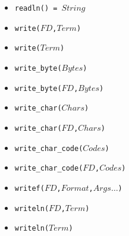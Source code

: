 \documentclass[10pt]{article}
\newcommand{\ignore}[1]{}
\begin{document}
\begin{multicols}{2}
\begin{scriptsize}
\begin{itemize}
   \item \texttt{readln() = $String$}
   \item \texttt{write($FD$,$Term$)}
   \item \texttt{write($Term$)}
   \item \texttt{write\_byte($Bytes$)}
   \item \texttt{write\_byte($FD$,$Bytes$)}
   \item \texttt{write\_char($Chars$)}
   \item \texttt{write\_char($FD$,$Chars$)}
   \item \texttt{write\_char\_code($Codes$)}
   \item \texttt{write\_char\_code($FD$,$Codes$)}
   \item \texttt{writef($FD$,$Format$,$Args\ldots$)}
   \item \texttt{writeln($FD$,$Term$)}
   \item \texttt{writeln($Term$)}
\ignore{
   \item \texttt{peek\_int($FD$) = $Int$}
   \item \texttt{peek\_real($FD$) = $Real$}
   \item \texttt{getpos($FD$) = $Pos$}
   \item \texttt{mkfifo($Path$)}
   \item \texttt{mkfifo($Path$,$Mode$)}
   \item \texttt{mkpipe() = $FD\_Map$}
   \item \texttt{mktmp() = $FD$}
   \item \texttt{peek\_unicode\_char($FD$) = $Val$}
   \item \texttt{rewind($FD$)}
   \item \texttt{seek($FD$,$Offset$,$From$)}
   \item \texttt{setpos($FD$,$Pos$)}
   \item \texttt{sizeof\_char() = $Size$}
   \item \texttt{stderr}
   \item \texttt{stdin}
   \item \texttt{stdout}
}
\end{itemize}
\end{scriptsize}

\end{multicols}
\end{document}
